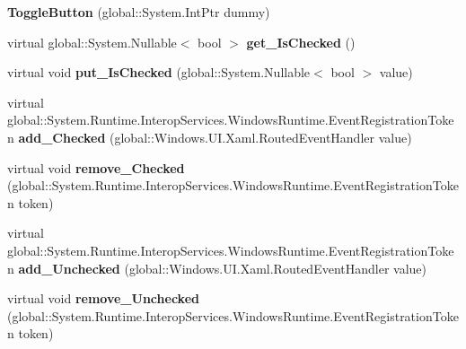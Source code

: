 \begin{DoxyCompactItemize}
{\bfseries Toggle\+Button} (global\+::\+System.\+Int\+Ptr dummy)
\item 
\mbox{\label{class_windows_1_1_u_i_1_1_xaml_1_1_controls_1_1_primitives_1_1_toggle_button_a202ddd3b271346dd0243b775278794c4}} 
virtual global\+::\+System.\+Nullable$<$ bool $>$ {\bfseries get\+\_\+\+Is\+Checked} ()
\item 
\mbox{\label{class_windows_1_1_u_i_1_1_xaml_1_1_controls_1_1_primitives_1_1_toggle_button_ac698bb4aa4d35725eb48fe2b35f4e0f8}} 
virtual void {\bfseries put\+\_\+\+Is\+Checked} (global\+::\+System.\+Nullable$<$ bool $>$ value)
\item 
\mbox{\label{class_windows_1_1_u_i_1_1_xaml_1_1_controls_1_1_primitives_1_1_toggle_button_a55fb908f07af09c5b2cbf2a26bb63503}} 
virtual global\+::\+System.\+Runtime.\+Interop\+Services.\+Windows\+Runtime.\+Event\+Registration\+Token {\bfseries add\+\_\+\+Checked} (global\+::\+Windows.\+U\+I.\+Xaml.\+Routed\+Event\+Handler value)
\item 
\mbox{\label{class_windows_1_1_u_i_1_1_xaml_1_1_controls_1_1_primitives_1_1_toggle_button_ab578caf9f875da4e2d95db0a1340c425}} 
virtual void {\bfseries remove\+\_\+\+Checked} (global\+::\+System.\+Runtime.\+Interop\+Services.\+Windows\+Runtime.\+Event\+Registration\+Token token)
\item 
\mbox{\label{class_windows_1_1_u_i_1_1_xaml_1_1_controls_1_1_primitives_1_1_toggle_button_a9bee5e40662d9de8fea1d16b5bb00d02}} 
virtual global\+::\+System.\+Runtime.\+Interop\+Services.\+Windows\+Runtime.\+Event\+Registration\+Token {\bfseries add\+\_\+\+Unchecked} (global\+::\+Windows.\+U\+I.\+Xaml.\+Routed\+Event\+Handler value)
\item 
\mbox{\label{class_windows_1_1_u_i_1_1_xaml_1_1_controls_1_1_primitives_1_1_toggle_button_ab20e6cc31c1ae3791da88ef65f9fffc3}} 
virtual void {\bfseries remove\+\_\+\+Unchecked} (global\+::\+System.\+Runtime.\+Interop\+Services.\+Windows\+Runtime.\+Event\+Registration\+Token token)

\end{DoxyCompactItemize}
